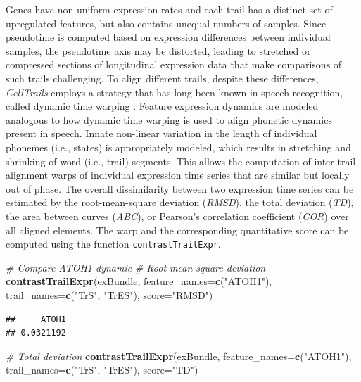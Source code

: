 \documentclass[]{book}
\newenvironment{Shaded}{\begin{snugshade}}{\end{snugshade}}
\newcommand{\KeywordTok}[1]{\textcolor[rgb]{0.13,0.29,0.53}{\textbf{#1}}}
\newcommand{\DataTypeTok}[1]{\textcolor[rgb]{0.13,0.29,0.53}{#1}}
\newcommand{\StringTok}[1]{\textcolor[rgb]{0.31,0.60,0.02}{#1}}
\newcommand{\CommentTok}[1]{\textcolor[rgb]{0.56,0.35,0.01}{\textit{#1}}}
\newcommand{\NormalTok}[1]{#1}
\theoremstyle{definition}
\theoremstyle{definition}
\theoremstyle{definition}
\theoremstyle{remark}
\begin{document}
Genes have non-uniform expression rates and each trail has a distinct
set of upregulated features, but also contains unequal numbers of
samples. Since pseudotime is computed based on expression differences
between individual samples, the pseudotime axis may be distorted,
leading to stretched or compressed sections of longitudinal expression
data that make comparisons of such trails challenging. To align
different trails, despite these differences, \emph{CellTrails} employs a
strategy that has long been known in speech recognition, called dynamic
time warping \citep{sakoe1978}. Feature expression dynamics are modeled
analogous to how dynamic time warping is used to align phonetic dynamics
present in speech. Innate non-linear variation in the length of
individual phonemes (i.e., states) is appropriately modeled, which
results in stretching and shrinking of word (i.e., trail) segments. This
allows the computation of inter-trail alignment warps of individual
expression time series that are similar but locally out of phase. The
overall dissimilarity between two expression time series can be
estimated by the root-mean-square deviation (\emph{RMSD}), the total
deviation (\emph{TD}), the area between curves (\emph{ABC}), or
Pearson's correlation coefficient (\emph{COR}) over all aligned
elements. The warp and the corresponding quantitative score can be
computed using the function \texttt{contrastTrailExpr}.

\begin{Shaded}
\begin{Highlighting}[]
\CommentTok{# Compare ATOH1 dynamic}
\CommentTok{# Root-mean-square deviation}
\KeywordTok{contrastTrailExpr}\NormalTok{(exBundle, }\DataTypeTok{feature_names=}\KeywordTok{c}\NormalTok{(}\StringTok{"ATOH1"}\NormalTok{), }
                  \DataTypeTok{trail_names=}\KeywordTok{c}\NormalTok{(}\StringTok{"TrS"}\NormalTok{, }\StringTok{"TrES"}\NormalTok{), }\DataTypeTok{score=}\StringTok{"RMSD"}\NormalTok{)}
\end{Highlighting}
\end{Shaded}

\begin{verbatim}
##     ATOH1 
## 0.0321192
\end{verbatim}

\begin{Shaded}
\begin{Highlighting}[]
\CommentTok{# Total deviation}
\KeywordTok{contrastTrailExpr}\NormalTok{(exBundle, }\DataTypeTok{feature_names=}\KeywordTok{c}\NormalTok{(}\StringTok{"ATOH1"}\NormalTok{), }
                  \DataTypeTok{trail_names=}\KeywordTok{c}\NormalTok{(}\StringTok{"TrS"}\NormalTok{, }\StringTok{"TrES"}\NormalTok{), }\DataTypeTok{score=}\StringTok{"TD"}\NormalTok{)}
\end{Highlighting}
\end{Shaded}
\end{document}
